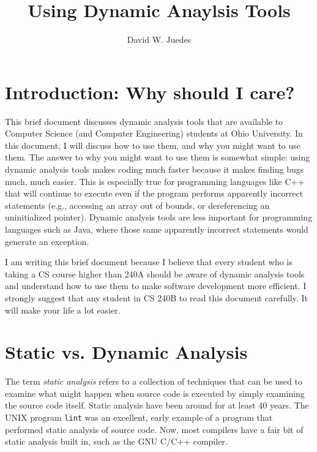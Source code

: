 \documentclass[12pt]{article}
\begin{document}
\title{Using Dynamic Anaylsis Tools}
\author{David W. Juedes}

\maketitle
\section{Introduction: Why should I care?}
This brief document discusses dynamic analysis tools that are
available to Computer Science (and Computer Engineering) students at Ohio
University.  In this document, I will discuss how to use them, and why you might want to use them.   The answer to why you might want to use them 
is somewhat simple: using dynamic analysis tools makes coding much
faster because it makes finding bugs much, much easier.  This is especially 
true for programming languages like C++ that will continue to execute even if the program performs apparently incorrect statements 
(e.g., accessing an array out of bounds, or dereferencing an 
uninitialized pointer).  Dynamic analysis tools are less important for programming languages such as Java, where those same apparently incorrect statements would generate an exception.
 
I am writing this brief document because I believe that every student
who is taking a CS course higher than 240A should be aware of dynamic
analysis tools and understand how to use them to make software
development more efficient.  I strongly suggest that any student in CS
240B to read this document carefully.  It will make your life a lot
easier.

\section{Static vs. Dynamic Analysis}
The term \emph{static analysis} refers to a collection of techniques
that can be used to examine what might happen when source code is
executed by simply examining the source code itself.  Static analysis
have been around for at least 40 years.  The UNIX program \verb+lint+
was an excellent, early example of a program that performed static
analysis of source code.  Now, most compilers have a fair bit of
static analysis built in, such as the GNU C/C++ compiler.   
\vspace*{0.2 in}

\noindent {}
\vspace*{0.2 in}
\end{document}
